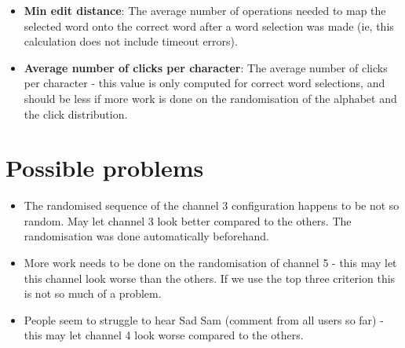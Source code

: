 \documentclass[10pt,fleqn,a4paper]{article}
\begin{document}
\begin{itemize}
\item {\bf Min edit distance}: The average number of operations needed to map the selected word onto the correct word after a word selection was made (ie, this calculation does not include timeout errors). 
\item {\bf Average number of clicks per character}: The average number of clicks per character - this value is only computed for correct word selections, and should be less if more work is done on the randomisation of the alphabet and the click distribution.
\end{itemize}

\section{Possible problems}

\begin{itemize}
\item The randomised sequence of the channel 3 configuration happens to be not so random. May let channel 3 look better compared to the others. The randomisation was done automatically beforehand.  
\item More work needs to be done on the randomisation of channel 5 - this may let this channel look worse than the others. If we use the top three criterion this is not so much of a problem. 
\item People seem to struggle to hear Sad Sam (comment from all users so far) - this may let channel 4 look worse compared to the others.    
\end{itemize} 
\end{document}
